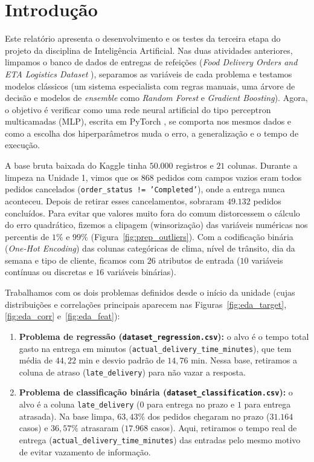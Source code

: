 \documentclass[12pt,a4paper]{article}
\begin{document}
\tableofcontents
\newpage

\section{Introdução}

Este relatório apresenta o desenvolvimento e os testes da terceira etapa do projeto da disciplina de Inteligência Artificial. Nas duas atividades anteriores, limpamos o banco de dados de entregas de refeições (\textit{Food Delivery Orders and ETA Logistics Dataset} \cite{kaggle_food_eta}), separamos as variáveis de cada problema e testamos modelos clássicos (um sistema especialista com regras manuais, uma árvore de decisão e modelos de \textit{ensemble} como \textit{Random Forest} e \textit{Gradient Boosting}). Agora, o objetivo é verificar como uma rede neural artificial do tipo perceptron multicamadas (MLP), escrita em PyTorch \cite{paszke2019}, se comporta nos mesmos dados e como a escolha dos hiperparâmetros muda o erro, a generalização e o tempo de execução.

A base bruta baixada do Kaggle tinha $50.000$ registros e $21$ colunas. Durante a limpeza na Unidade 1, vimos que os $868$ pedidos com campos vazios eram todos pedidos cancelados (\texttt{order\_status != 'Completed'}), onde a entrega nunca aconteceu. Depois de retirar esses cancelamentos, sobraram $49.132$ pedidos concluídos. Para evitar que valores muito fora do comum distorcessem o cálculo do erro quadrático, fizemos a clipagem (winsorização) das variáveis numéricas nos percentis de $1\%$ e $99\%$ (Figura~\ref{fig:prep_outliers}). Com a codificação binária (\textit{One-Hot Encoding}) das colunas categóricas de clima, nível de trânsito, dia da semana e tipo de cliente, ficamos com $26$ atributos de entrada ($10$ variáveis contínuas ou discretas e $16$ variáveis binárias).

Trabalhamos com os dois problemas definidos desde o início da unidade (cujas distribuições e correlações principais aparecem nas Figuras~\ref{fig:eda_target}, \ref{fig:eda_corr} e~\ref{fig:eda_feat}):
\begin{enumerate}
    \item \textbf{Problema de regressão (\texttt{dataset\_regression.csv}):} o alvo é o tempo total gasto na entrega em minutos (\texttt{actual\_\allowbreak delivery\_\allowbreak time\_\allowbreak minutes}), que tem média de $44{,}22\text{ min}$ e desvio padrão de $14{,}76\text{ min}$. Nessa base, retiramos a coluna de atraso (\texttt{late\_delivery}) para não vazar a resposta.
    \item \textbf{Problema de classificação binária (\texttt{dataset\_classification.csv}):} o alvo é a coluna \texttt{late\_delivery} ($0$ para entrega no prazo e $1$ para entrega atrasada). Na base limpa, $63{,}43\%$ dos pedidos chegaram no prazo ($31.164$ casos) e $36{,}57\%$ atrasaram ($17.968$ casos). Aqui, retiramos o tempo real de entrega (\texttt{actual\_\allowbreak delivery\_\allowbreak time\_\allowbreak minutes}) das entradas pelo mesmo motivo de evitar vazamento de informação.
\end{enumerate}
\end{document}

